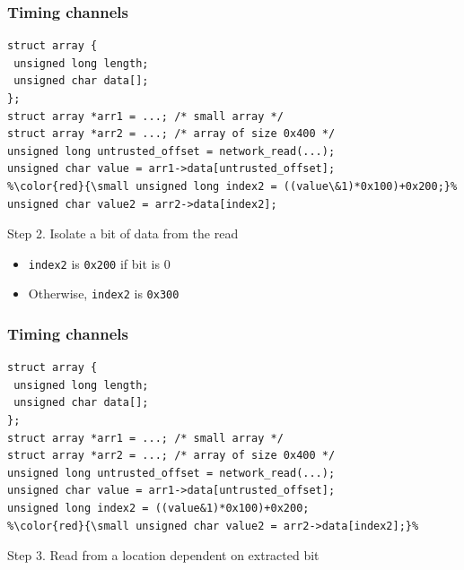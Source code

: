 \documentclass[10pt,handout]{beamer}
\begin{document}

\begin{frame}[fragile]

\frametitle{Timing channels}

\begin{lstlisting}[basicstyle=\small,style=customjava]
struct array {
 unsigned long length;
 unsigned char data[];
};
struct array *arr1 = ...; /* small array */
struct array *arr2 = ...; /* array of size 0x400 */
unsigned long untrusted_offset = network_read(...);
unsigned char value = arr1->data[untrusted_offset];
%\color{red}{\small unsigned long index2 = ((value\&1)*0x100)+0x200;}%
unsigned char value2 = arr2->data[index2];
\end{lstlisting}

\begin{center}
Step 2. Isolate a bit of data from the read \pause
\begin{itemize}
\item \texttt{index2} is \texttt{0x200} if bit is 0
\item Otherwise, \texttt{index2} is \texttt{0x300}
\end{itemize}
\end{center}

\end{frame}


\begin{frame}[fragile]

\frametitle{Timing channels}

\begin{lstlisting}[basicstyle=\small,style=customjava]
struct array {
 unsigned long length;
 unsigned char data[];
};
struct array *arr1 = ...; /* small array */
struct array *arr2 = ...; /* array of size 0x400 */
unsigned long untrusted_offset = network_read(...);
unsigned char value = arr1->data[untrusted_offset];
unsigned long index2 = ((value&1)*0x100)+0x200;
%\color{red}{\small unsigned char value2 = arr2->data[index2];}%
\end{lstlisting}

\begin{center}
Step 3. Read from a location dependent on extracted bit
\end{center}

\end{frame}

\end{document}
